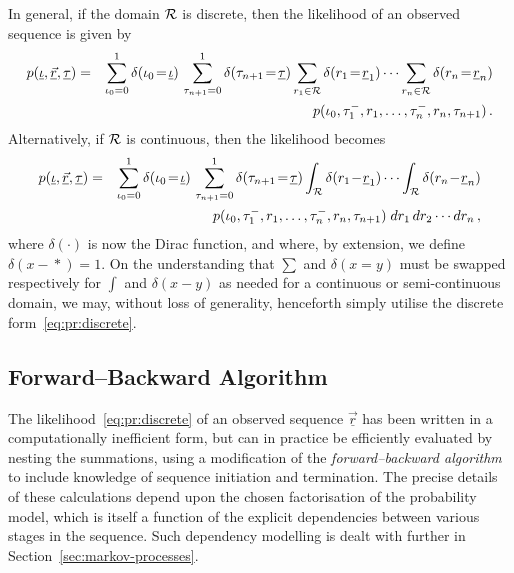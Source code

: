 \documentclass[a4paper]{article}
\newcommand{\ui}{\underline{\iota}}
\newcommand{\ut}{\underline{\tau}}
\newcommand{\ur}{\underline{r}}
\begin{document}
In general, if the domain ${\cal R}$  is discrete, then the likelihood of an observed sequence is given by
\begin{eqnarray}
p(\ui,\underline{\vec{r}},\ut) 
& = & 
\sum_{\iota_0=0}^{1}\delta(\iota_0\!=\!\ui)
\,\sum_{\tau_{n+1}=0}^{1}\delta(\tau_{n+1}\!=\!\ut)
\sum_{r_1\in{\cal R}} \delta(r_1\!=\!\ur_1)
\cdots\sum_{r_n\in{\cal R}} \delta(r_n\!=\!\ur_n)
\nonumber\\
&& \hspace*{5mm}
p(\iota_0,\tau^-_1,r_1,\ldots,\tau^-_n,r_n,\tau_{n+1})\,.
\label{eq:pr:discrete}
\end{eqnarray}
Alternatively, if ${\cal R}$ is continuous, then the likelihood becomes
\begin{eqnarray}
p(\ui,\underline{\vec{r}},\ut) 
& = & 
\sum_{\iota_0=0}^{1}\delta(\iota_0\!=\!\ui)
\,\sum_{\tau_{n+1}=0}^{1}\delta(\tau_{n+1}\!=\!\ut)
\int_{{\cal R}} \delta(r_1\!-\!\ur_1)
\cdots\int_{{\cal R}} \delta(r_n\!-\!\ur_n)
\nonumber\\
&& \hspace*{5mm}
p(\iota_0,\tau^-_1,r_1,\ldots,\tau^-_n,r_n,\tau_{n+1})
\;dr_1\,dr_2\cdots dr_n
\,,
\end{eqnarray}
where $\delta(\cdot)$ is now the Dirac function, and where, by extension, we define $\delta(x\!-\!*)=1$.
On the understanding that $\sum$ and $\delta(x\!=\!y)$ must be swapped respectively for $\int$ and $\delta(x\!-\!y)$ as needed for a continuous 
or semi-continuous domain, we may, without loss of generality, henceforth simply utilise the discrete form~\eqref{eq:pr:discrete}.

\subsection{Forward--Backward Algorithm}

The likelihood~\eqref{eq:pr:discrete} of an observed sequence $\underline{\vec{r}}$ has been written in a computationally inefficient form,
but can in practice be efficiently evaluated by nesting the summations, using a modification of the {\em forward--backward algorithm} to include knowledge of
sequence initiation and termination.
The precise details of these calculations depend upon the chosen factorisation of the probability model, which is itself a function of
the explicit dependencies between various stages in the sequence. Such dependency modelling is dealt with further in Section~\ref{sec:markov-processes}.
\end{document}

